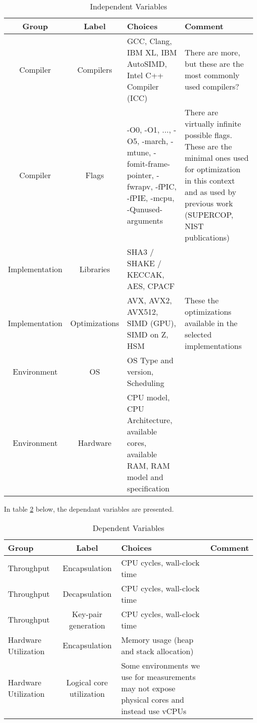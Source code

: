 \begin{table}[H]
    \centering
    \begin{tabular}{c|c|p{4cm}|p{3cm}}
        Group & Label & Choices & Comment \\
        \hline
        Compiler & Compilers & GCC, Clang, IBM XL, IBM AutoSIMD, Intel C++ Compiler (ICC) & There are more, but these are the most commonly used compilers? \\
        Compiler & Flags & -O0, -O1, ..., -O5, -march, -mtune, -fomit-frame-pointer, -fwrapv, -fPIC, -fPIE, -mcpu, -Qunused-arguments & There are virtually infinite possible flags. These are the minimal ones used for optimization in this context and as used by previous work (SUPERCOP, NIST publications) \\
        Implementation & Libraries & SHA3 / SHAKE / KECCAK, AES, CPACF & \\
        Implementation & Optimizations & AVX, AVX2, AVX512, SIMD (GPU), SIMD on Z, HSM & These the optimizations available in the selected implementations \\
        Environment & OS & OS Type and version, Scheduling & \\
        Environment & Hardware & CPU model, CPU Architecture, available cores, available RAM, RAM model and specification & \\
    \end{tabular}
    \caption{Independent Variables}
    \label{table:method:experiment:independent-variables}
\end{table}

In table \ref{table:method:experiment:dependent-variables} below, the dependant variables are presented.

\begin{table}[H]
    \centering
    \begin{tabular}{l|c|p{4cm}|p{3cm}}
        Group & Label & Choices & Comment \\
        \hline
        Throughput & Encapsulation & CPU cycles, wall-clock time & \\
        Throughput & Decapsulation & CPU cycles, wall-clock time & \\
        Throughput & Key-pair generation & CPU cycles, wall-clock time & \\
        Hardware Utilization & Encapsulation & Memory usage (heap and stack allocation) & \\
        Hardware Utilization & Logical core utilization & Some environments we use for measurements may not expose physical cores and instead use vCPUs
    \end{tabular}
    \caption{Dependent Variables}
    \label{table:method:experiment:dependent-variables}
\end{table}

